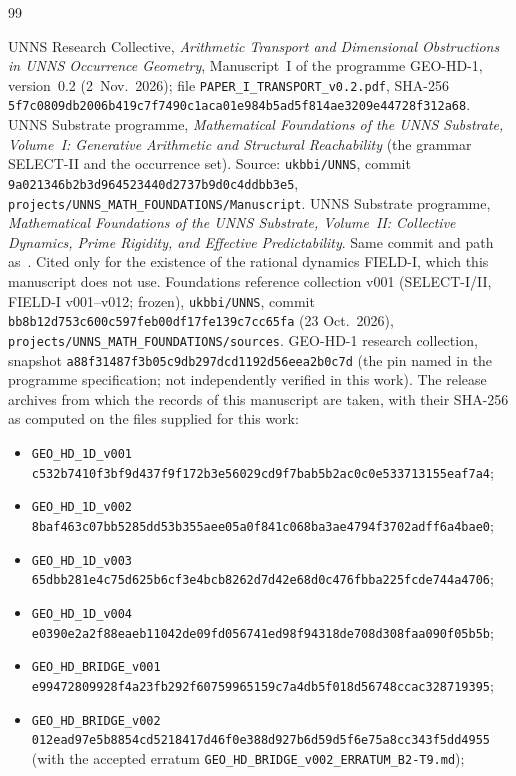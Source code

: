 \clearpage
{}
\begin{thebibliography}{99}\small\raggedright
{} UNNS Research Collective, \emph{Arithmetic Transport and Dimensional Obstructions in UNNS Occurrence Geometry}, Manuscript~I of the programme GEO-HD-1, version~0.2 (2~Nov.\ 2026); file \texttt{PAPER\_I\_TRANSPORT\_v0.2.pdf}, SHA-256 \texttt{5f7c0809db2006b419c7f7490c1aca01e984b5ad5f814ae3209e44728f312a68}.
 UNNS Substrate programme, \emph{Mathematical Foundations of the UNNS Substrate, Volume~I: Generative Arithmetic and Structural Reachability} (the grammar SELECT-II and the occurrence set). Source: \texttt{ukbbi/UNNS}, commit \texttt{9a021346b2b3d964523440d2737b9d0c4ddbb3e5}, \texttt{projects/UNNS\_MATH\_FOUNDATIONS/Manuscript}.
 UNNS Substrate programme, \emph{Mathematical Foundations of the UNNS Substrate, Volume~II: Collective Dynamics, Prime Rigidity, and Effective Predictability}. Same commit and path as~\cite{FoundI}. Cited only for the existence of the rational dynamics FIELD-I, which this manuscript does not use.
 Foundations reference collection v001 (SELECT-I/II, FIELD-I v001--v012; frozen), \texttt{ukbbi/UNNS}, commit \texttt{bb8b12d753c600c597feb00df17fe139c7cc65fa} (23 Oct.\ 2026), \texttt{projects/UNNS\_MATH\_FOUNDATIONS/sources}.
 GEO-HD-1 research collection, snapshot \texttt{a88f31487f3b05c9db297dcd1192d56eea2b0c7d} (the pin named in the programme specification; not independently verified in this work). The release archives from which the records of this manuscript are taken, with their SHA-256 as computed on the files supplied for this work:
\begin{itemize}[leftmargin=1.4em,itemsep=1pt,topsep=2pt]\footnotesize
\item\texttt{GEO\_HD\_1D\_v001} \texttt{c532b7410f3bf9d437f9f172b3e56029cd9f7bab5b2ac0c0e533713155eaf7a4};
\item\texttt{GEO\_HD\_1D\_v002} \texttt{8baf463c07bb5285dd53b355aee05a0f841c068ba3ae4794f3702adff6a4bae0};
\item\texttt{GEO\_HD\_1D\_v003} \texttt{65dbb281e4c75d625b6cf3e4bcb8262d7d42e68d0c476fbba225fcde744a4706};
\item\texttt{GEO\_HD\_1D\_v004} \texttt{e0390e2a2f88eaeb11042de09fd056741ed98f94318de708d308faa090f05b5b};
\item\texttt{GEO\_HD\_BRIDGE\_v001} \texttt{e99472809928f4a23fb292f60759965159c7a4db5f018d56748ccac328719395};
\item\texttt{GEO\_HD\_BRIDGE\_v002} \texttt{012ead97e5b8854cd5218417d46f0e388d927b6d59d5f6e75a8cc343f5dd4955} (with the accepted erratum \texttt{GEO\_HD\_BRIDGE\_v002\_ERRATUM\_B2-T9.md});

\end{itemize}
\end{thebibliography}
